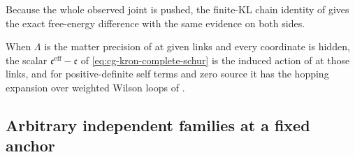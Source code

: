 Because the whole observed joint is pushed, the finite-KL chain identity of
 gives the exact free-energy difference with the same
evidence on both sides.

When \(\Lambda\) is the matter precision of  at given
links and every coordinate is hidden, the scalar
\(\mathfrak c^{\mathrm{eff}}-\mathfrak c\) of \eqref{eq:cg-kron-complete-schur} is
the induced action of  at those links, and for
positive-definite self terms and zero source it has the hopping expansion over
weighted Wilson loops of .

\subsection{Arbitrary independent families at a fixed anchor}
\label{sec:cg-independent-kron-families}


